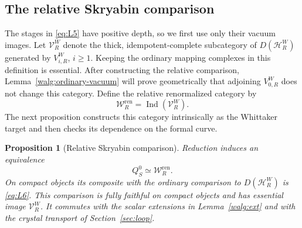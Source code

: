 \documentclass[11pt]{article}
\numberwithin{equation}{section}
\newtheorem{proposition}[theorem]{Proposition}
\theoremstyle{definition}
\theoremstyle{remark}
\begin{document}
\subsection{The relative Skryabin comparison}

The stages in \eqref{eq:L5} have positive depth, so we first use
only their vacuum images.  Let \(\mathcal V_R^W\) denote the thick,
idempotent-complete subcategory of \(D(\mathcal H_R^W)\) generated
by \(V_{i,R}^W\), \(i\geq1\).  Keeping the ordinary mapping
complexes in this definition is essential.  After constructing the
relative comparison, Lemma~\ref{walg:ordinary-vacuum} will prove
geometrically that adjoining \(V_{0,R}^W\) does not change this
category.  Define the relative renormalized category by
\[
 \mathcal W_R^{\mathrm{ren}}=
       \operatorname{Ind}(\mathcal V_R^W).
\]
The next proposition constructs this category intrinsically as the
Whittaker target and then checks its dependence on the formal curve.

\begin{proposition}[Relative Skryabin comparison]\label{walg:relative-skryabin}
Reduction induces an equivalence
\[
 Q_S^0\simeq\mathcal W_R^{\mathrm{ren}}.
\]
On compact objects its composite with the ordinary comparison to
\(D(\mathcal H_R^W)\) is \eqref{eq:L6}.  This comparison is fully
faithful on compact objects and has essential image
\(\mathcal V_R^W\).  It commutes with the scalar extensions in
Lemma~\ref{walg:ext} and with the crystal transport of
Section~\ref{sec:loop}.
\end{proposition}
\end{document}
